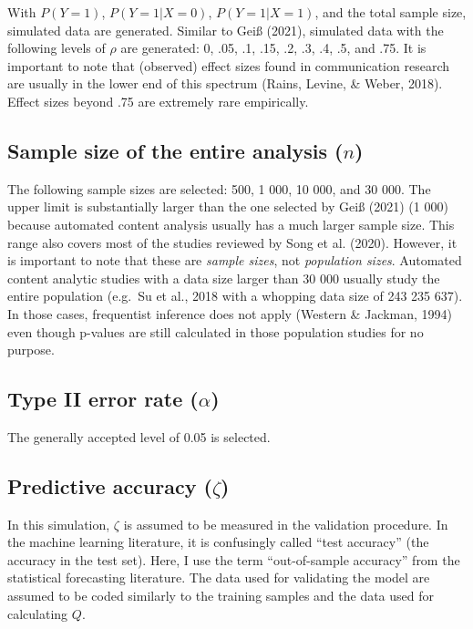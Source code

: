 \documentclass[english,man,floatsintext]{apa6}
\begin{document}
With \(P(Y=1)\), \(P(Y=1|X=0)\), \(P(Y=1|X=1)\), and the total sample size, simulated data are generated. Similar to Geiß (2021), simulated data with the following levels of \(\rho\) are generated: 0, .05, .1, .15, .2, .3, .4, .5, and .75. It is important to note that (observed) effect sizes found in communication research are usually in the lower end of this spectrum (Rains, Levine, \& Weber, 2018). Effect sizes beyond .75 are extremely rare empirically.

\hypertarget{sample-size-of-the-entire-analysis-n}{%
\subsection{\texorpdfstring{Sample size of the entire analysis (\(n\))}{Sample size of the entire analysis (n)}}\label{sample-size-of-the-entire-analysis-n}}

The following sample sizes are selected: 500, 1 000, 10 000, and 30 000. The upper limit is substantially larger than the one selected by Geiß (2021) (1 000) because automated content analysis usually has a much larger sample size. This range also covers most of the studies reviewed by Song et al. (2020). However, it is important to note that these are \emph{sample sizes}, not \emph{population sizes}. Automated content analytic studies with a data size larger than 30 000 usually study the entire population (e.g.~Su et al., 2018 with a whopping data size of 243 235 637). In those cases, frequentist inference does not apply (Western \& Jackman, 1994) even though p-values are still calculated in those population studies for no purpose.

\hypertarget{type-ii-error-rate-alpha}{%
\subsection{\texorpdfstring{Type II error rate (\(\alpha\))}{Type II error rate (\textbackslash{}alpha)}}\label{type-ii-error-rate-alpha}}

The generally accepted level of 0.05 is selected.

\hypertarget{predictive-accuracy-zeta}{%
\subsection{\texorpdfstring{Predictive accuracy (\(\zeta\))}{Predictive accuracy (\textbackslash{}zeta)}}\label{predictive-accuracy-zeta}}

In this simulation, \(\zeta\) is assumed to be measured in the validation procedure. In the machine learning literature, it is confusingly called \enquote{test accuracy} (the accuracy in the test set). Here, I use the term \enquote{out-of-sample accuracy} from the statistical forecasting literature. The data used for validating the model are assumed to be coded similarly to the training samples and the data used for calculating \(Q\).
\end{document}
